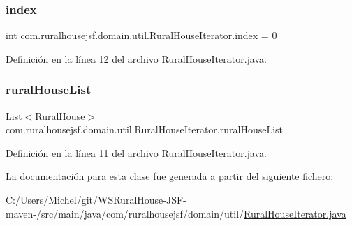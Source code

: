 \subsubsection{\texorpdfstring{index}{index}}
{\footnotesize\ttfamily int com.\+ruralhousejsf.\+domain.\+util.\+Rural\+House\+Iterator.\+index = 0\hspace{0.3cm}{\ttfamily [private]}}



Definición en la línea 12 del archivo Rural\+House\+Iterator.\+java.

\mbox{\label{classcom_1_1ruralhousejsf_1_1domain_1_1util_1_1_rural_house_iterator_a86506cdc509d2a232309bdcf939f4d51}} 
\subsubsection{\texorpdfstring{ruralHouseList}{ruralHouseList}}
{\footnotesize\ttfamily List$<$\mbox{\hyperlink{classcom_1_1ruralhousejsf_1_1domain_1_1_rural_house}{Rural\+House}}$>$ com.\+ruralhousejsf.\+domain.\+util.\+Rural\+House\+Iterator.\+rural\+House\+List\hspace{0.3cm}{\ttfamily [private]}}



Definición en la línea 11 del archivo Rural\+House\+Iterator.\+java.



La documentación para esta clase fue generada a partir del siguiente fichero\+:\begin{DoxyCompactItemize}
\item 
C\+:/\+Users/\+Michel/git/\+W\+S\+Rural\+House-\/\+J\+S\+F-\/maven-\//src/main/java/com/ruralhousejsf/domain/util/\mbox{\hyperlink{_rural_house_iterator_8java}{Rural\+House\+Iterator.\+java}}\end{DoxyCompactItemize}
